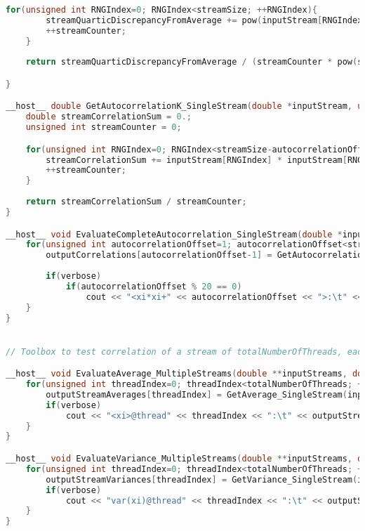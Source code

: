 \begin{lstlisting}[language=C++, caption={\texttt{libraries/CoreLibraries/RandomGenerator/CorrelationToolbox.cu}}]
	for(unsigned int RNGIndex=0; RNGIndex<streamSize; ++RNGIndex){
		streamQuarticDiscrepancyFromAverage += pow(inputStream[RNGIndex] - streamAverage,4);
		++streamCounter;
	}
	
	return streamQuarticDiscrepancyFromAverage / (streamCounter * pow(streamVariance,4));

}

__host__ double GetAutocorrelationK_SingleStream(double *inputStream, unsigned int autocorrelationOffset, unsigned int streamSize){
	double streamCorrelationSum = 0.;
	unsigned int streamCounter = 0;

	for(unsigned int RNGIndex=0; RNGIndex<streamSize-autocorrelationOffset; ++RNGIndex){
		streamCorrelationSum += inputStream[RNGIndex] * inputStream[RNGIndex+autocorrelationOffset];
		++streamCounter;
	}
	
	return streamCorrelationSum / streamCounter;
}

__host__ void EvaluateCompleteAutocorrelation_SingleStream(double *inputStream, double *outputCorrelations, unsigned int streamSize, bool verbose){
	for(unsigned int autocorrelationOffset=1; autocorrelationOffset<streamSize-1; ++autocorrelationOffset){
		outputCorrelations[autocorrelationOffset-1] = GetAutocorrelationK_SingleStream(inputStream, autocorrelationOffset, streamSize);
		
		if(verbose)
			if(autocorrelationOffset % 20 == 0)
				cout << "<xi*xi+" << autocorrelationOffset << ">:\t" << outputCorrelations[autocorrelationOffset-1] << endl;
	}
}


// Toolbox to test correlation of a stream of totalNumberOfThreads, each generating numbersToGeneratePerThread random numbers. A positive verbose variable will, well, print the output for further testing

__host__ void EvaluateAverage_MultipleStreams(double **inputStreams, double *outputStreamAverages, unsigned int totalNumberOfThreads, unsigned int numbersToGeneratePerThread, bool verbose){
	for(unsigned int threadIndex=0; threadIndex<totalNumberOfThreads; ++threadIndex){
		outputStreamAverages[threadIndex] = GetAverage_SingleStream(inputStreams[threadIndex],numbersToGeneratePerThread);	
		if(verbose)
			cout << "<xi>@thread" << threadIndex << ":\t" << outputStreamAverages[threadIndex] << endl;
	}
}

__host__ void EvaluateVariance_MultipleStreams(double **inputStreams, double *inputStreamAverages, double *outputStreamVariances, unsigned int totalNumberOfThreads, unsigned int numbersToGeneratePerThread, bool verbose){
	for(unsigned int threadIndex=0; threadIndex<totalNumberOfThreads; ++threadIndex){
		outputStreamVariances[threadIndex] = GetVariance_SingleStream(inputStreams[threadIndex], inputStreamAverages[threadIndex], numbersToGeneratePerThread);
		if(verbose)
			cout << "var(xi)@thread" << threadIndex << ":\t" << outputStreamVariances[threadIndex] << endl;
	}
}


\end{lstlisting}
